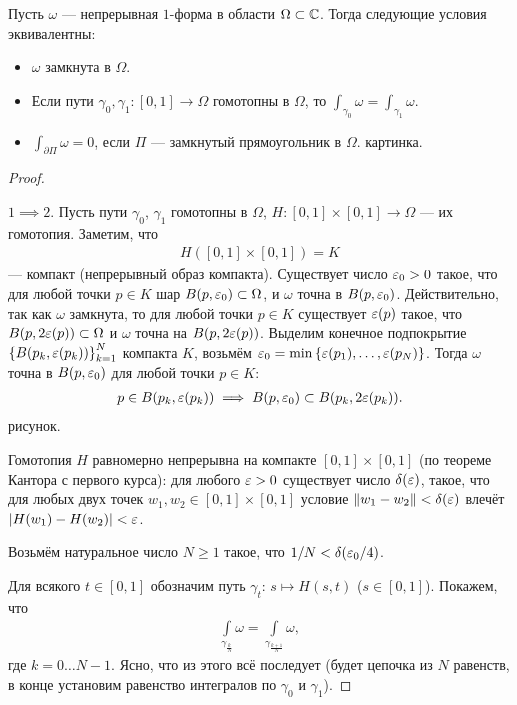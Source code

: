 \begin{thm}
 Пусть $\omega$ --- непрерывная $1$-форма в области $\Omega \subset \mathbb{C}$. Тогда следующие условия эквивалентны:
 \begin{itemize}
  \item $\omega$ замкнута в $\Omega$.
  \item Если пути $\gamma_0, \gamma_1 \colon [0,1] \to \Omega$ гомотопны в $\Omega$, то $\int_{\gamma_0} \omega = \int_{\gamma_1} \omega $.
  \item $\int_{\partial \Pi} \omega = 0$, если $\Pi$ --- замкнутый прямоугольник в $\Omega$. {\color{red} картинка}.
 \end{itemize}
\end{thm}
\begin{proof}\

 $1 \implies 2$. Пусть пути $\gamma_0$, $\gamma_1$ гомотопны в $\Omega$, $H \colon [0,1] \times [0,1] \to \Omega$ --- их гомотопия. Заметим, что
 \begin{align*}
  H([0,1] \times [0,1]) = K
 \end{align*}  --- компакт (непрерывный образ компакта). Существует число $\varepsilon_0 > 0$ такое, что для любой точки $p \in K$ шар $B(p,\varepsilon_0) \subset \Omega$, и $\omega$ точна в $B(p,\varepsilon_0)$. Действительно, так как $\omega$ замкнута, то для любой точки $p \in K$ существует $\varepsilon(p)$ такое, что $B(p,2\varepsilon(p))\subset\Omega$ и $\omega$ точна на $B(p,2\varepsilon(p))$. Выделим конечное подпокрытие $\left\{ B(p_k, \varepsilon(p_k)) \right\}_{k=1}^{N}$ компакта $K$, возьмём $\varepsilon_0 = \min \left\{ \varepsilon(p_1), \ldots, \varepsilon(p_N) \right\}$. Тогда $\omega$ точна в $B(p,\varepsilon_0)$ для любой точки $p \in K$:
 \begin{align*}
  p \in B(p_k,\varepsilon(p_k)) \implies B(p,\varepsilon_0) \subset B(p_k,2\varepsilon(p_k))
 .\end{align*} 
 {\color{red} рисунок.}

 Гомотопия $H$ равномерно непрерывна на компакте $[0,1]\times[0,1]$ (по теореме Кантора с первого курса): для любого $\varepsilon > 0$ существует число $\delta(\varepsilon)$, такое, что для любых двух точек $w_1,w_2 \in [0,1] \times [0,1]$ условие $\left\| w_1 - w_2 \right\| < \delta(\varepsilon)$ влечёт $\left| H(w_1)-H(w_2) \right| < \varepsilon$.

 Возьмём натуральное число $N \geqslant 1$ такое, что $1 / N < \delta(\varepsilon_0 / 4)$.

 Для всякого $t \in [0,1]$ обозначим путь $\gamma_t \colon\, s \mapsto H(s,t)$ ($s \in [0,1]$). Покажем, что
 \begin{align*}
  \int\limits_{\gamma_{\frac{k}{N}}}  \omega = \int\limits_{\gamma_{\frac{k+1}{N}}}  \omega,
 \end{align*} где $k = 0 \ldots N - 1$. Ясно, что из этого всё последует (будет цепочка из $N$ равенств, в конце установим равенство интегралов по $\gamma_0$ и $\gamma_1$).


\end{proof}
